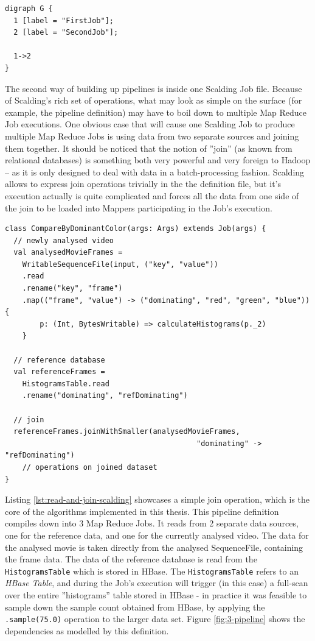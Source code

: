 \begin{lstlisting}[caption={Textual description of graph on Figure \ref{fig:simplest-pipeline}, using the DOT graph description language.}, label={lst:simplest-pipeline-dot}]
digraph G {
  1 [label = "FirstJob"];
  2 [label = "SecondJob"];
  
  1->2
}
\end{lstlisting}

The second way of building up pipelines is inside one Scalding Job file. Because of Scalding's rich set of operations, what may look as simple on the surface (for example, the pipeline definition) may have to boil down to multiple Map Reduce Job executions. One obvious case that will cause one Scalding Job to produce multiple Map Reduce Jobs is using data from two separate sources and joining them together. It should be noticed that the notion of ''join'' (as known from relational databases) is something both very powerful and very foreign to Hadoop -- as it is only designed to deal with data in a batch-processing fashion. Scalding allows to express join operations trivially in the the definition file, but it's execution actually is quite complicated and forces all the data from one side of the join to be loaded into Mappers participating in the Job's execution.

\begin{lstlisting}[caption={Scalding job, reading data from 2 sources and joining them on dominantColor, producing 3 Map Reduce Jobs}, label={lst:read-and-join-scalding}]
class CompareByDominantColor(args: Args) extends Job(args) {
  // newly analysed video
  val analysedMovieFrames = 
    WritableSequenceFile(input, ("key", "value"))
    .read
    .rename("key", "frame")
    .map(("frame", "value") -> ("dominating", "red", "green", "blue")) { 
        p: (Int, BytesWritable) => calculateHistograms(p._2)
    }
  
  // reference database
  val referenceFrames = 
    HistogramsTable.read
    .rename("dominating", "refDominating")

  // join
  referenceFrames.joinWithSmaller(analysedMovieFrames, 
                                            "dominating" -> "refDominating")
    // operations on joined dataset
}
\end{lstlisting}

Listing \ref{lst:read-and-join-scalding} showcases a simple join operation, which is the core of the algorithms implemented in this thesis. This pipeline definition compiles down into 3 Map Reduce Jobs. It reads from 2 separate data sources, one for the reference data, and one for the currently analysed video. The data for the analysed movie is taken directly from the analysed SequenceFile, containing the frame data. The data of the reference database is read from the \verb|HistogramsTable| which is stored in HBase. The \verb|HistogramsTable| refers to an \textit{HBase Table}, and during the Job's execution will trigger (in this case) a full-scan over the entire ''histograms'' table stored in HBase - in practice it was feasible to sample down the sample count obtained from HBase, by applying the \verb|.sample(75.0)| operation to the larger data set. Figure \ref{fig:3-pipeline} shows the dependencies as modelled by this definition.

